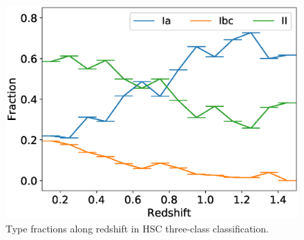 \documentclass[useamsfonts]{pasj01}
\begin{document}

%
\begin{figure}[htbp]
  \begin{center}
     \includegraphics[width=\columnwidth]{figures/SNfrac_alongz.eps}
  \end{center}
  \caption{%
  Type fractions along redshift in HSC three-class classification.
  }%
  \label{fig:hsc3_type_frac_alongz}
\end{figure}
%
\end{document}
